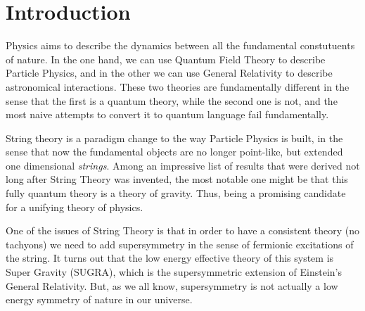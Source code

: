 

\chapter{Introduction}
\label{chap:intro}
\pagestyle{fancy}









Physics aims to describe the dynamics between all the fundamental constutuents of nature. In the one hand, we can use Quantum Field Theory to describe Particle Physics, and in the other we can use General Relativity to describe astronomical interactions. These two theories are fundamentally different in the sense that the first is a quantum theory, while the second one is not, and the most naive attempts to convert it to quantum language fail fundamentally.

String theory is a paradigm change to the way Particle Physics is built, in the sense that now the fundamental objects are no longer point-like, but extended one dimensional \textit{strings}. Among an impressive list of results that were derived not long after String Theory was invented, the most notable one might be that this fully quantum theory is a theory of gravity. Thus, being a promising candidate for a unifying theory of physics.

One of the issues of String Theory is that in order to have a consistent theory (no tachyons) we need to add supersymmetry in the sense of fermionic excitations of the string. It turns out that the low energy effective theory of this system is Super Gravity (SUGRA), which is the supersymmetric extension of Einstein's General Relativity. But, as we all know, supersymmetry is not actually a low energy symmetry of nature in our universe.

